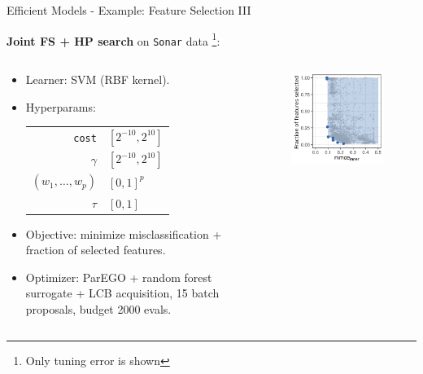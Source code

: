 \documentclass[11pt,compress,t,notes=noshow,xcolor=table]{beamer}
\begin{document}
\begin{vbframe}{Efficient Models - Example: Feature Selection III}

\textbf{Joint FS + HP search} on \texttt{Sonar} data%
\footnote{Only tuning error is shown}:

\begin{columns}
\begin{column}{0.65\textwidth}
\begin{itemize}
  \item Learner: SVM (RBF kernel).
  \item Hyperparams:
    \begin{tabular}{rl}
      \texttt{cost} & $[2^{-10},2^{10}]$ \\
      $\gamma$      & $[2^{-10},2^{10}]$ \\
      $(w_1,\dots,w_p)$ & $[0,1]^p$ \\
      $\tau$        & $[0,1]$
    \end{tabular}
  \item Objective: minimize misclassification + fraction of selected features.
  \item Optimizer: ParEGO + random forest surrogate + LCB acquisition, 15 batch proposals, budget 2000 evals.
\end{itemize}
\end{column}
\begin{column}{0.35\textwidth}
\begin{figure}
\includegraphics[width=\linewidth]{figure_man/mosmafs_sonar_eval_domHV.pdf}
\end{figure}
\end{column}
\end{columns}

\end{vbframe}
\end{document}
